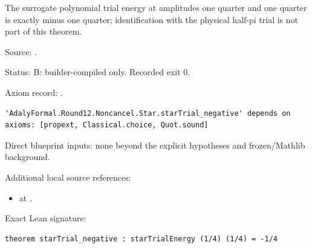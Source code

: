 \begin{theorem}[bp-194]
\label{bp-194}
\uses{}
\leanok
The surrogate polynomial trial energy at amplitudes one quarter and one quarter is exactly minus one quarter; identification with the physical half-pi trial is not part of this theorem.

\par Source: \texttt{}.
\par Status: B: builder-compiled only. Recorded exit 0.
\par Axiom record: \texttt{}.
\begin{verbatim}
'AdalyFormal.Round12.Noncancel.Star.starTrial_negative' depends on axioms: [propext, Classical.choice, Quot.sound]
\end{verbatim}
\par Direct blueprint inputs: none beyond the explicit hypotheses and frozen/Mathlib background.
\par Additional local source references:
\begin{itemize}
\item \texttt{} at \texttt{}.
\end{itemize}
\par Exact Lean signature:
\begin{verbatim}
theorem starTrial_negative : starTrialEnergy (1/4) (1/4) = -1/4
\end{verbatim}
\end{theorem}

